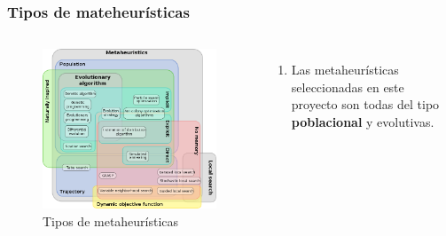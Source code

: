 \begin{frame}
  \frametitle{Tipos de mateheurísticas}
  \begin{columns}
    \begin{figure}
      \begin{center}
        \includegraphics[width=1\textwidth]{imagenes/chapter1/mh_euler_graph.png}
      \end{center}
      \caption{Tipos de metaheurísticas}
    \end{figure}
    \begin{enumerate}
      \item Las metaheurísticas seleccionadas en este proyecto son todas del tipo \textbf{poblacional} y evolutivas.
    \end{enumerate}
  \end{columns}
\end{frame}

\note{

}


\note{

}